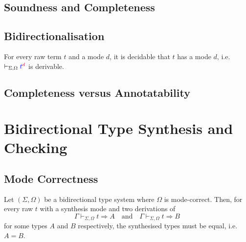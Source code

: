 \documentclass[acmsmall,screen]{acmart}
\theoremstyle{acmdefinition}
\begin{document}
\subsection{Soundness and Completeness}
\begin{theorem}[Soundness]\label{thm:term-soundness}
    
\end{theorem}



\begin{theorem}[Completeness]\label{thm:term-completeness}
    
\end{theorem}

\subsection{Bidirectionalisation}
\begin{theorem} \label{thm:bidirectionalisation}
  For every raw term $t$ and a mode $d$, it is decidable that $t$ has a mode $d$, i.e.\ $\vdash_{\Sigma, \Omega} {\textcolor{blue}{t}}^{\mathrel{\textcolor{purple}{d}}}$ is derivable.
\end{theorem}

\subsection{Completeness versus Annotatability}


\section{Bidirectional Type Synthesis and Checking} \label{sec:type-synthesis}

\subsection{Mode Correctness}

\begin{theorem}\label{thm:unique-syn}
  Let $(\Sigma, \Omega)$ be a bidirectional type system where $\Omega$ is mode-correct.
  Then, for every raw $t$ with a synthesis mode and two derivations of 
  \[
    \Gamma \vdash_{\Sigma, \Omega} t \Rightarrow A
    \quad\text{and}\quad
    \Gamma \vdash_{\Sigma, \Omega} t \Rightarrow B
  \]
  for some types $A$ and $B$ respectively, the synthesised types must be equal, i.e.\ $A = B$.
\end{theorem}
 
\end{document}
